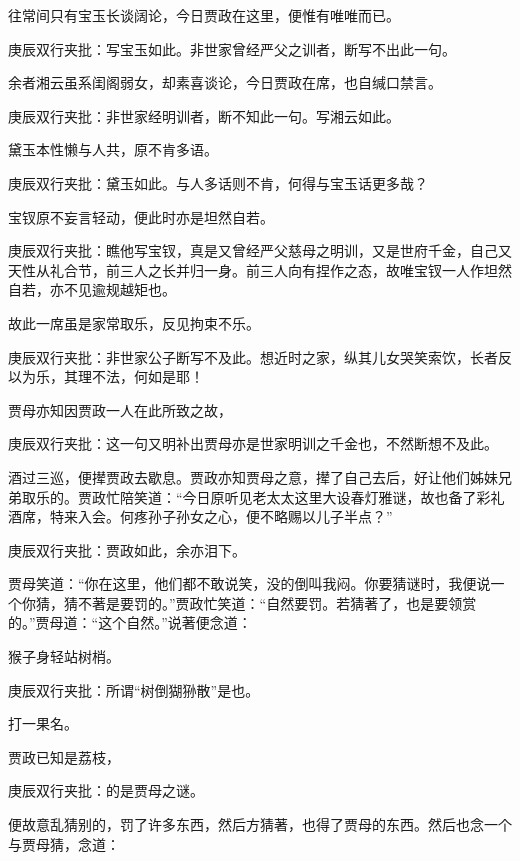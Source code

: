 \begin{parag}


    往常间只有宝玉长谈阔论，今日贾政在这里，便惟有唯唯而已。\begin{note}庚辰双行夹批：写宝玉如此。非世家曾经严父之训者，断写不出此一句。\end{note}余者湘云虽系闺阁弱女，却素喜谈论，今日贾政在席，也自缄口禁言。\begin{note}庚辰双行夹批：非世家经明训者，断不知此一句。写湘云如此。\end{note}黛玉本性懒与人共，原不肯多语。\begin{note}庚辰双行夹批：黛玉如此。与人多话则不肯，何得与宝玉话更多哉？\end{note}宝钗原不妄言轻动，便此时亦是坦然自若。\begin{note}庚辰双行夹批：瞧他写宝钗，真是又曾经严父慈母之明训，又是世府千金，自己又天性从礼合节，前三人之长并归一身。前三人向有捏作之态，故唯宝钗一人作坦然自若，亦不见逾规越矩也。\end{note}故此一席虽是家常取乐，反见拘束不乐。\begin{note}庚辰双行夹批：非世家公子断写不及此。想近时之家，纵其儿女哭笑索饮，长者反以为乐，其理不法，何如是耶！\end{note}贾母亦知因贾政一人在此所致之故，\begin{note}庚辰双行夹批：这一句又明补出贾母亦是世家明训之千金也，不然断想不及此。\end{note}酒过三巡，便撵贾政去歇息。贾政亦知贾母之意，撵了自己去后，好让他们姊妹兄弟取乐的。贾政忙陪笑道：“今日原听见老太太这里大设春灯雅谜，故也备了彩礼酒席，特来入会。何疼孙子孙女之心，便不略赐以儿子半点？”\begin{note}庚辰双行夹批：贾政如此，余亦泪下。\end{note}贾母笑道：“你在这里，他们都不敢说笑，没的倒叫我闷。你要猜谜时，我便说一个你猜，猜不著是要罚的。”贾政忙笑道：“自然要罚。若猜著了，也是要领赏的。”贾母道：“这个自然。”说著便念道：
\end{parag}


\begin{parag}


    猴子身轻站树梢。\begin{note}庚辰双行夹批：所谓“树倒猢狲散”是也。\end{note}打一果名。
\end{parag}


\begin{parag}


    贾政已知是荔枝，\begin{note}庚辰双行夹批：的是贾母之谜。\end{note}便故意乱猜别的，罚了许多东西，然后方猜著，也得了贾母的东西。然后也念一个与贾母猜，念道：
\end{parag}


